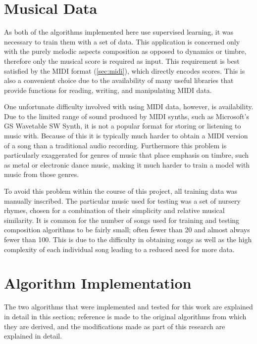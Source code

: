 \documentclass[ author={Stephen Livermore-Tozer},
				supervisor={Dr. Peter Flach},
				degree={MEng},
				title={Algorithmic Co-composition Using Machine Learning},
				subtitle={},
				type={research},
				year={2016} ]{dissertation}
\begin{document}
	\section{Musical Data}
	\label{sec:midi-data}
	
	As both of the algorithms implemented here use supervised learning, it was necessary to train them with a set of data. This application is concerned only with the purely melodic aspects composition as opposed to dynamics or timbre, therefore only the musical score is required as input. This requirement is best satisfied by the MIDI format (\ref{sec:midi}), which directly encodes scores. This is also a convenient choice due to the availability of many useful libraries that provide functions for reading, writing, and manipulating MIDI data. 
	
	One unfortunate difficulty involved with using MIDI data, however, is availability. Due to the limited range of sound produced by MIDI synths, such as Microsoft's GS Wavetable SW Synth, it is not a popular format for storing or listening to music with. Because of this it is typically much harder to obtain a MIDI version of a song than a traditional audio recording. Furthermore this problem is particularly exaggerated for genres of music that place emphasis on timbre, such as metal or electronic dance music, making it much harder to train a model with music from those genres. 
	
	To avoid this problem within the course of this project, all training data was manually inscribed. The particular music used for testing was a set of nursery rhymes, chosen for a combination of their simplicity and relative musical similarity. It is common for the number of songs used for training and testing composition algorithms to be fairly small; often fewer than 20 and almost always fewer than 100. This is due to the difficulty in obtaining songs as well as the high complexity of each individual song leading to a reduced need for more data.
		
	\section{Algorithm Implementation}
	\label{sec:implementation}
	
	The two algorithms that were implemented and tested for this work are explained in detail in this section; reference is made to the original algorithms from which they are derived, and the modifications made as part of this research are explained in detail. 
	
\end{document}

